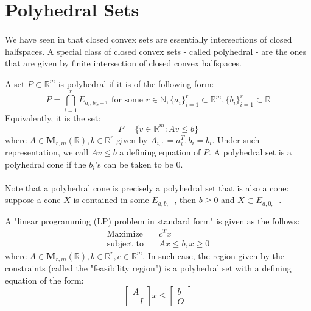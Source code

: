 \section{Polyhedral Sets}
\label{sect:017}

\paragraph{}We have seen in  that closed convex sets are essentially intersections of closed halfspaces. A special class of closed convex sets - called polyhedral - are the ones that are given by finite intersection of closed convex halfspaces.

\begin{defn}\label{defn:017-polyhedral-sets}
	A set $P\subset \mathbb{R}^m$ is polyhedral if it is of the following form:
	\[
		P=\bigcap_{i=1}^rE_{a_i,b_i,-},\text{ for some }r\in \mathbb{N},\{a_i\}_{i=1}^r\subset\mathbb{R}^m,\{b_i\}_{i=1}^r\subset\mathbb{R}
	\]
	Equivalently, it is the set:
	\[
		P=\{v\in \mathbb{R}^m:Av\leq b\}
	\]
	where $A\in \mathbf{M}_{r,m}(\mathbb{R}),b\in \mathbb{R}^r$ given by $A_{i,:}=a_i^T,b_i=b_i$. Under such representation, we call $Av\leq b$ a defining equation of $P$. A polyhedral set is a polyhedral cone if the $b_i$'s can be taken to be $0$.
\end{defn}

\paragraph{}Note that a polyhedral cone is precisely a polyhedral set that is also a cone: suppose a cone $X$ is contained in some $E_{a,b,-}$, then $b\geq 0$ and $X\subset E_{a,0,-}$.

\begin{exmp}
	A "linear programming (LP) problem in standard form" is given as the follows:
	\begin{align*}
		\text{Maximize}\quad   & c^Tx              \\
		\text{subject to}\quad & Ax\leq b, x\geq 0
	\end{align*}
	where $A\in \mathbf{M}_{r,m}(\mathbb{R}),b\in \mathbb{R}^r,c\in \mathbb{R}^m$. In such case, the region given by the constraints (called the "feasibility region") is a polyhedral set with a defining equation of the form:
	\[
		\left[
			\begin{array}{r}
				A \\\hline
				-I
			\end{array}
			\right]
		x\leq
		\left[
			\begin{array}{r}
				b \\\hline
				O
			\end{array}
			\right]
	\]
\end{exmp}

